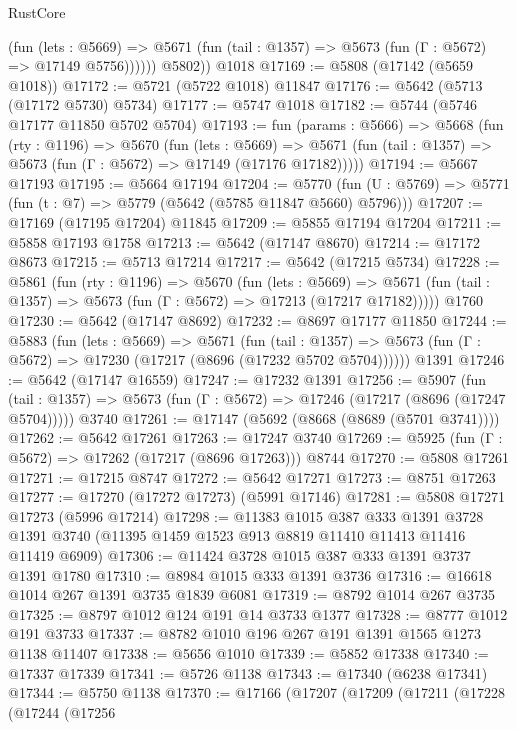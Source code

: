 \begin{lexlean}{RustCore}
\begin{coremodule}
              (fun (lets : @5669) =>
              @5671 (fun (tail : @1357) => @5673 (fun (Γ : @5672) => @17149 @5756))))))
        @5802))
    @1018
@17169 := @5808 (@17142 (@5659 @1018))
@17172 := @5721 (@5722 @1018) @11847
@17176 := @5642 (@5713 (@17172 @5730) @5734)
@17177 := @5747 @1018
@17182 := @5744 (@5746 @17177 @11850 @5702 @5704)
@17193 := fun (params : @5666) =>
  @5668
    (fun (rty : @1196) =>
    @5670
      (fun (lets : @5669) =>
      @5671 (fun (tail : @1357) => @5673 (fun (Γ : @5672) => @17149 (@17176 @17182)))))
@17194 := @5667 @17193
@17195 := @5664 @17194
@17204 := @5770
    (fun (U : @5769) => @5771 (fun (t : @7) => @5779 (@5642 (@5785 @11847 @5660) @5796)))
@17207 := @17169 (@17195 @17204) @11845
@17209 := @5855 @17194 @17204
@17211 := @5858 @17193 @1758
@17213 := @5642 (@17147 @8670)
@17214 := @17172 @8673
@17215 := @5713 @17214
@17217 := @5642 (@17215 @5734)
@17228 := @5861
    (fun (rty : @1196) =>
    @5670
      (fun (lets : @5669) =>
      @5671 (fun (tail : @1357) => @5673 (fun (Γ : @5672) => @17213 (@17217 @17182)))))
    @1760
@17230 := @5642 (@17147 @8692)
@17232 := @8697 @17177 @11850
@17244 := @5883
    (fun (lets : @5669) =>
    @5671
      (fun (tail : @1357) =>
      @5673 (fun (Γ : @5672) => @17230 (@17217 (@8696 (@17232 @5702 @5704))))))
    @1391
@17246 := @5642 (@17147 @16559)
@17247 := @17232 @1391
@17256 := @5907
    (fun (tail : @1357) => @5673 (fun (Γ : @5672) => @17246 (@17217 (@8696 (@17247 @5704)))))
    @3740
@17261 := @17147 (@5692 (@8668 (@8689 (@5701 @3741))))
@17262 := @5642 @17261
@17263 := @17247 @3740
@17269 := @5925 (fun (Γ : @5672) => @17262 (@17217 (@8696 @17263))) @8744
@17270 := @5808 @17261
@17271 := @17215 @8747
@17272 := @5642 @17271
@17273 := @8751 @17263
@17277 := @17270 (@17272 @17273) (@5991 @17146)
@17281 := @5808 @17271 @17273 (@5996 @17214)
@17298 := @11383
    @1015
    @387
    @333
    @1391
    @3728
    @1391
    @3740
    (@11395 @1459 @1523 @913 @8819 @11410 @11413 @11416 @11419 @6909)
@17306 := @11424 @3728 @1015 @387 @333 @1391 @3737 @1391 @1780
@17310 := @8984 @1015 @333 @1391 @3736
@17316 := @16618 @1014 @267 @1391 @3735 @1839 @6081
@17319 := @8792 @1014 @267 @3735
@17325 := @8797 @1012 @124 @191 @14 @3733 @1377
@17328 := @8777 @1012 @191 @3733
@17337 := @8782 @1010 @196 @267 @191 @1391 @1565 @1273 @1138 @11407
@17338 := @5656 @1010
@17339 := @5852 @17338
@17340 := @17337 @17339
@17341 := @5726 @1138
@17343 := @17340 (@6238 @17341)
@17344 := @5750 @1138
@17370 := @17166
    (@17207
      (@17209
        (@17211
          (@17228
            (@17244
              (@17256

\end{coremodule}
\end{lexlean}
